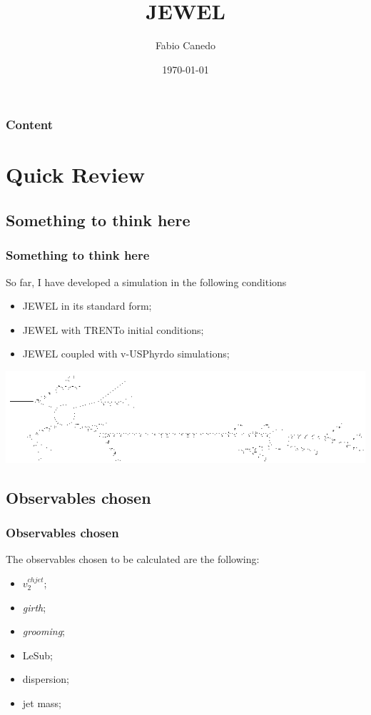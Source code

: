 \documentclass{beamer}
\title[JEWEL]{JEWEL}
\institute[HEPIC-Instituto de Física]{HEPIC-Instituto de Física}
\author{Fabio Canedo}
\date{\today}
\newcommand*\titleTOC{Content}
\begin{document}
{
\usebackgroundtemplate{}%
\frame{\titlepage}
}

{
\begin{frame}\frametitle{\titleTOC}
	\tableofcontents
\end{frame}
}

\section{Quick Review}
\subsection{Something to think here}

\begin{frame}\frametitle{Something to think here}
        So far, I have developed a simulation in the following conditions
        \begin{itemize}
        \item JEWEL in its standard form;
        \item JEWEL with TRENTo initial conditions;
        \item JEWEL coupled with v-USPhyrdo simulations;
        \end{itemize}
        \begin{minipage}{1.0\textwidth}
		\includegraphics[scale=0.5]{images/feynman.png}        
        \end{minipage}
\end{frame}

\subsection{Observables chosen}
\begin{frame}\frametitle{Observables chosen}
	The observables chosen to be calculated are the following:
	\begin{itemize}
	\item $v_2^{ch jet}$;
	\pause
	\item \emph{girth};
	\pause
	\item \emph{grooming};
	\pause
	\item LeSub;
	\pause
	\item dispersion;
	\pause
	\item jet mass;
	\end{itemize}
\end{frame}
\end{document}
